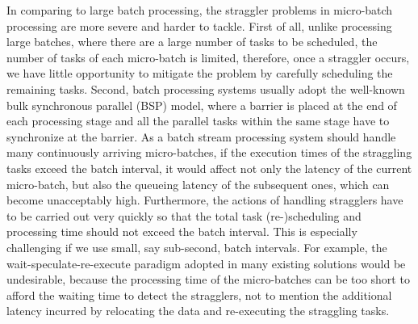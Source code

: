 In comparing to large batch processing, the straggler problems in micro-batch
processing are more severe and harder to tackle. First of all, unlike processing
large batches, where there are a large number of tasks to be scheduled, the
number of tasks of each micro-batch is limited, therefore, once a straggler
occurs, we have little opportunity to mitigate the problem by carefully
scheduling the remaining tasks.  Second, batch processing systems usually adopt
the well-known bulk synchronous parallel (BSP) model, where a barrier is placed
at the end of each processing stage and all the parallel tasks within the same
stage have to synchronize at the barrier.  As a batch stream processing system
should handle many continuously arriving micro-batches, if the execution times
of the straggling tasks exceed the batch interval, it would affect not only the
latency of the current micro-batch, but also the queueing latency of the subsequent
ones, which can become unacceptably high. Furthermore, the actions of handling
stragglers have to be carried out very quickly so that the total task
(re-)scheduling and processing time should not exceed the batch interval. This
is especially challenging if we use small, say sub-second, batch intervals. For
example, the wait-speculate-re-execute paradigm adopted in many existing
solutions \cite{Dean2004} \cite{Zaharia2008} \cite{Kwon2012} would be
undesirable, because the processing time of the micro-batches can be too short
to afford the waiting time to detect the stragglers, not to mention the
additional latency incurred by relocating the data and re-executing the
straggling tasks. 


